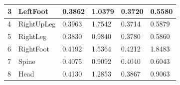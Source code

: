 \begin{table}[h]
\begin{tabular}{ll|l|l|l|l|}
\multicolumn{1}{|l|}{3}                                                       & LeftFoot                                              & 0.3862                                                           & 1.0379                                                        & 0.3720                                                          & 0.5580                                                        \\ \hline
\multicolumn{1}{|l|}{4}                                                       & RightUpLeg                                            & 0.3963                                                           & 1.7542                                                        & 0.3714                                                          & 0.5879                                                        \\ \hline
\multicolumn{1}{|l|}{5}                                                       & RightLeg                                              & 0.3830                                                           & 0.9840                                                        & 0.3780                                                          & 0.5860                                                        \\ \hline
\multicolumn{1}{|l|}{6}                                                       & RightFoot                                             & 0.4192                                                           & 1.5364                                                        & 0.4212                                                          & 1.8483                                                        \\ \hline
\multicolumn{1}{|l|}{7}                                                       & Spine                                                 & 0.4075                                                           & 0.9092                                                        & 0.4040                                                          & 0.6043                                                        \\ \hline
\multicolumn{1}{|l|}{8}                                                       & Head                                                  & 0.4130                                                           & 1.2853                                                        & 0.3867                                                          & 0.9063                                                        \\ \hline

\end{tabular}
\end{table}
